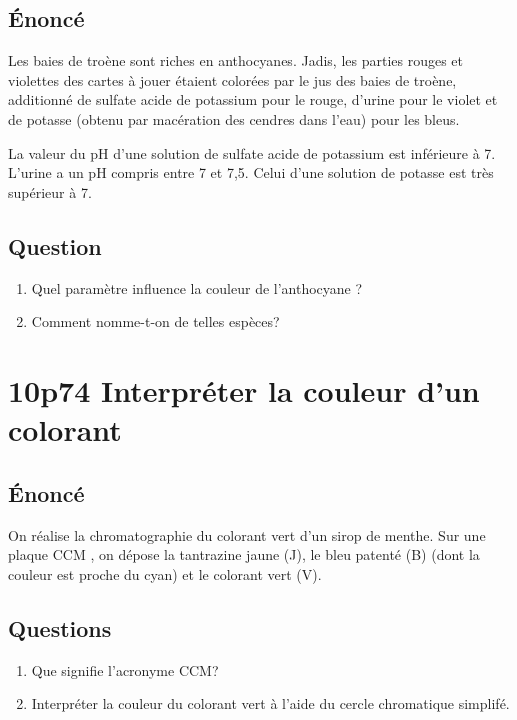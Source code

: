 \documentclass[11pt]{article}
\begin{document}
\subsection{Énoncé}
\label{sec:orgheadline9}
Les baies de troène sont riches en anthocyanes.
Jadis, les parties rouges et violettes des cartes à jouer étaient colorées par le jus des baies de troène, additionné de sulfate acide de potassium pour le rouge, d'urine pour le violet et de potasse (obtenu par macération des cendres dans l'eau) pour les bleus.

La valeur du pH d'une solution de sulfate acide de potassium est inférieure à 7.
L'urine a un pH compris entre 7 et 7,5.
Celui d'une solution de potasse est très supérieur à 7.

\subsection{Question}
\label{sec:orgheadline10}
\begin{enumerate}
\item Quel paramètre influence la couleur de l'anthocyane ?
\item Comment nomme-t-on de telles espèces?
\end{enumerate}

\section{10p74 Interpréter la couleur d'un colorant}
\label{sec:orgheadline14}
\subsection{Énoncé}
\label{sec:orgheadline12}
On réalise la chromatographie du colorant vert d'un sirop de menthe. 
Sur une plaque CCM , on dépose la tantrazine jaune (J), le bleu patenté (B) (dont la couleur est proche du cyan) et le colorant vert (V).
\subsection{Questions}
\label{sec:orgheadline13}
\begin{enumerate}
\item Que signifie l'acronyme CCM?
\item Interpréter la couleur du colorant vert à l'aide du cercle chromatique simplifé.
\end{enumerate}
\end{document}
